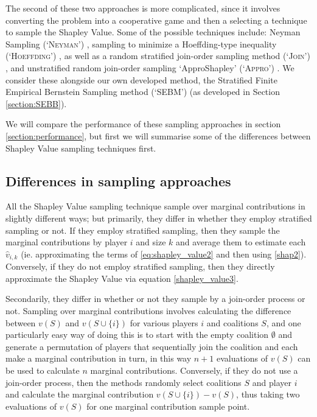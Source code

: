 The second of these two approaches is more complicated, since it involves converting the problem into a cooperative game and then a selecting a technique to sample the Shapley Value.
Some of the possible techniques include: Neyman Sampling (`\textsc{Neyman}') \citep{CASTRO2017180,1938.10503378}, sampling to minimize a Hoeffding-type inequality (`\textsc{Hoeffding}') \citep{2013arXiv1306.4265M}, as well as a random stratified join-order sampling method (`\textsc{Join}') \citep{CASTRO2017180}, and unstratified random join-order sampling `ApproShapley' (`\textsc{Appro}') \citep{DBLP:journals/cor/CastroGT09}.
We consider these alongside our own developed method, the Stratified Finite Empirical Bernstein Sampling method (`SEBM') (as developed in Section \ref{section:SEBB}).

We will compare the performance of these sampling approaches in section \ref{section:performance}, but first we will summarise some of the differences between Shapley Value sampling techniques first.

\subsection{Differences in sampling approaches}

All the Shapley Value sampling technique sample over marginal contributions in slightly different ways; but primarily, they differ in whether they employ stratified sampling or not.
If they employ stratified sampling, then they sample the marginal contributions by player $i$ and size $k$ and average them to estimate each $\hat{v}_{i,k}$ (ie. approximating the terms of \eqref{eq:shapley_value2} and then using \eqref{shap2}).
Conversely, if they do not employ stratified sampling, then they directly approximate the Shapley Value via equation \eqref{shapley_value3}.

Secondarily, they differ in whether or not they sample by a join-order process or not. Sampling over marginal contributions involves calculating the difference between $v(S)$ and $v(S\cup\{i\})$ for various players $i$ and coalitions $S$, and one particularly easy way of doing this is to start with the empty coalition $\emptyset$ and generate a permutation of players that sequentially join the coalition and each make a marginal contribution in turn, in this way $n+1$ evaluations of $v(S)$ can be used to calculate $n$ marginal contributions.
Conversely, if they do not use a join-order process, then the methods randomly select coalitions $S$ and player $i$ and calculate the marginal contribution $v(S\cup\{i\}) - v(S)$, thus taking two evaluations of $v(S)$ for one marginal contribution sample point.

